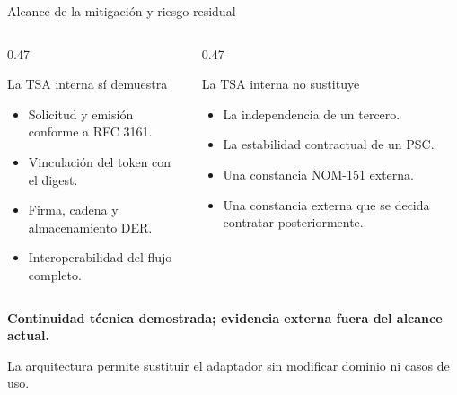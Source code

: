 \begin{frame}{Alcance de la mitigación y riesgo residual}
  \begin{columns}[T,onlytextwidth]
    \begin{column}{0.47\textwidth}
      \begin{exampleblock}{La TSA interna sí demuestra}
        \small
        \begin{itemize}
          \item Solicitud y emisión conforme a RFC 3161.
          \item Vinculación del token con el digest.
          \item Firma, cadena y almacenamiento DER.
          \item Interoperabilidad del flujo completo.
        \end{itemize}
      \end{exampleblock}
    \end{column}
    \begin{column}{0.47\textwidth}
      \begin{alertblock}{La TSA interna no sustituye}
        \small
        \begin{itemize}
          \item La independencia de un tercero.
          \item La estabilidad contractual de un PSC.
          \item Una constancia NOM-151 externa.
          \item Una constancia externa que se decida contratar posteriormente.
        \end{itemize}
      \end{alertblock}
    \end{column}
  \end{columns}

  \vspace{0.15cm}
  \centering
  {\small\bfseries\color{tinta}Continuidad técnica demostrada; evidencia externa fuera del alcance actual.}\par
  \vspace{0.08cm}
  {\scriptsize\color{gris}La arquitectura permite sustituir el adaptador sin modificar dominio ni casos de uso.}
\end{frame}
